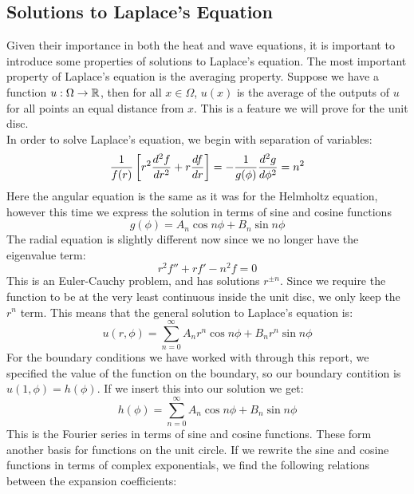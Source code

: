 \documentclass{article}
\begin{document}
\begin{appendices}
\section{Solutions to Laplace's Equation}
Given their importance in both the heat and wave equations, it is important to introduce some properties of solutions to Laplace's equation. The most important property of Laplace's equation is the averaging property. Suppose we have a function $u:\Omega\rightarrow\mathbb{R}$, then for all $x\in\Omega$, $u(x)$ is the average of the outputs of $u$ for all points an equal distance from $x$. This is a feature we will prove for the unit disc.\\
In order to solve Laplace's equation, we begin with separation of variables:
\begin{equation}
  \frac{1}{f(r)}\left[ r^2 \frac{d ^2 f}{d r^2} + r\frac{d f}{d r} \right] =-\frac{1}{g(\phi)}\frac{d ^2 g}{d \phi^2} = n^2
\end{equation}
Here the angular equation is the same as it was for the Helmholtz equation, however this time we express the solution in terms of sine and cosine functions
\begin{equation}
  g(\phi)=A_n \cos n\phi+B_n \sin n\phi
\end{equation}
The radial equation is slightly different now since we no longer have the eigenvalue term:
\begin{equation}
  r^2 f''+ r f'- n^2 f=0
\end{equation}
This is an Euler-Cauchy problem, and has solutions $r^{\pm n}$. Since we require the function to be at the very least continuous inside the unit disc, we only keep the $r^n$ term. This means that the general solution to Laplace's equation is:
\begin{equation}
  u(r,\phi)=\sum_{n=0}^\infty A_n r^n \cos n\phi + B_n r^n \sin n\phi
\end{equation}
For the boundary conditions we have worked with through this report, we specified the value of the function on the boundary, so our boundary contition is $u(1,\phi)= h(\phi)$. If we insert this into our solution we get:
\begin{equation}
  h(\phi) = \sum_{n=0}^\infty A_n \cos n\phi+B_n \sin n\phi
\end{equation}
This is the Fourier series in terms of sine and cosine functions. These form another basis for functions on the unit circle. If we rewrite the sine and cosine functions in terms of complex exponentials, we find the following relations between the expansion coefficients:

\end{appendices}
\end{document}

